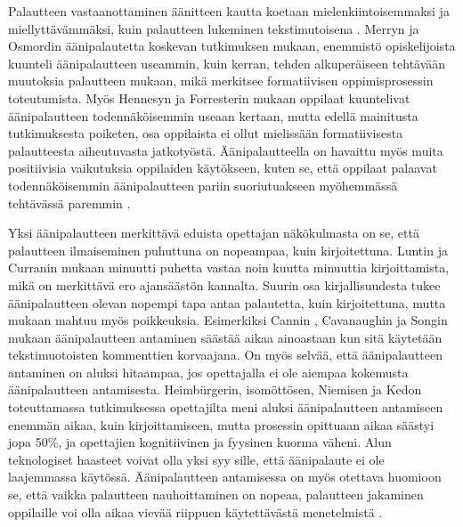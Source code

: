 \documentclass[utf8]{gradu3}
\begin{document}
Palautteen vastaanottaminen äänitteen kautta koetaan mielenkiintoisemmaksi ja miellyttävämmäksi, kuin palautteen lukeminen tekstimutoisena \parencite[][]{listenOrToRead}. Merryn ja Osmordin \parencite[][]{attitudes} äänipalautetta koskevan tutkimuksen mukaan, enemmistö opiskelijoista kuunteli äänipalautteen useammin, kuin kerran, tehden alkuperäiseen tehtävään muutoksia palautteen mukaan, mikä merkitsee formatiivisen oppimisprosessin toteutumista. Myös Hennesyn ja Forresterin \parencite[][]{attitudes} mukaan oppilaat kuuntelivat äänipalautteen todennäköisemmin useaan kertaan, mutta edellä mainitusta tutkimuksesta poiketen, osa oppilaista ei ollut mielissään formatiivisesta palautteesta aiheutuvasta jatkotyöstä. Äänipalautteella on havaittu myös muita positiivisia vaikutuksia oppilaiden käytökseen, kuten se, että oppilaat palaavat todennäköisemmin äänipalautteen pariin suoriutuakseen myöhemmässä tehtävässä paremmin \parencite[][]{voice}.

Yksi äänipalautteen merkittävä eduista opettajan näkökulmasta on se, että palautteen ilmaiseminen puhuttuna on nopeampaa, kuin kirjoitettuna. Luntin ja Curranin \parencite[][]{areYouListening} mukaan minuutti puhetta vastaa noin kuutta minuuttia kirjoittamista, mikä on merkittävä ero ajansäästön kannalta. Suurin osa kirjallisuudesta tukee äänipalautteen olevan nopempi tapa antaa palautetta, kuin kirjoitettuna, mutta mukaan mahtuu myös poikkeuksia. Esimerkiksi Cannin \parencite[][]{engaging}, Cavanaughin ja Songin \parencite[][]{versus} mukaan äänipalautteen antaminen säästää aikaa ainoastaan kun sitä käytetään tekstimuotoisten kommenttien korvaajana. On myös selvää, että äänipalautteen antaminen on aluksi hitaampaa, jos opettajalla ei ole aiempaa kokemusta äänipalautteen antamisesta. Heimbürgerin, isomöttösen, Niemisen ja Kedon \parencite[][]{academics} toteuttamassa tutkimuksessa opettajilta meni aluksi äänipalautteen antamiseen enemmän aikaa, kuin kirjoittamiseen, mutta prosessin opittuaan aikaa säästyi jopa 50\%, ja opettajien kognitiivinen ja fyysinen kuorma väheni. Alun teknologiset haasteet voivat olla yksi syy sille, että äänipalaute ei ole laajemmassa käytössä. Äänipalautteen antamisessa on myös otettava huomioon se, että vaikka palautteen nauhoittaminen on nopeaa, palautteen jakaminen oppilaille voi olla aikaa vievää riippuen käytettävästä menetelmistä \parencite[][]{engaging}.
\end{document}
